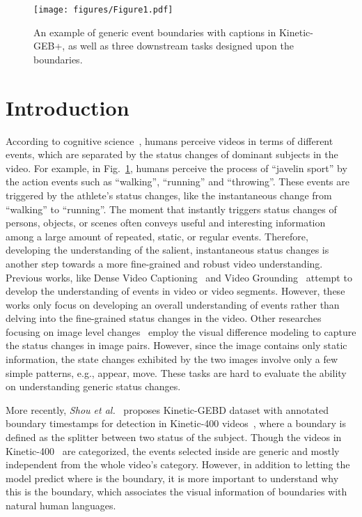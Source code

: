 \documentclass[runningheads]{llncs}
\begin{document}
\begin{figure}[t]
\centering
\texttt{[image: figures/Figure1.pdf]}
\setlength{\abovecaptionskip}{0.5cm}
\caption{An example of generic event boundaries with captions in Kinetic-GEB+, as well as three downstream tasks designed upon the boundaries.}
\label{fig:overview}
\end{figure}

\section{Introduction}


According to cognitive science~\cite{radvansky2011event}, humans perceive videos in terms of different events, which are separated by the status changes of dominant subjects in the video. For example, in Fig.~\ref{fig:overview}, humans perceive the process of “javelin sport” by the action events such as “walking”, “running” and “throwing”. These events are triggered by the athlete’s status changes, like the instantaneous change from “walking” to “running”. The moment that instantly triggers status changes of persons, objects, or scenes often conveys useful and interesting information among a large amount of repeated, static, or regular events. Therefore, developing the understanding of the salient, instantaneous status changes is another step towards a more fine-grained and robust video understanding.
Previous works, like Dense Video Captioning~\cite{krishna2017dense,zhou2018towards,wang2021end,li2018jointly,iashin2020multi} and Video Grounding~\cite{regneri2013grounding,gao2017tall,cao2021pursuit,ge2019mac,mun2020local,yuan2019find,zeng2020dense} attempt to develop the understanding of events in video or video segments. However, these works only focus on developing an overall understanding of events rather than delving into the fine-grained status changes in the video. Other researches focusing on image level changes~\cite{park2019robust,jhamtani2018learning} employ the visual difference modeling to capture the status changes in image pairs. However, 
since the image contains only static information, the state changes exhibited by the two images involve only a few simple patterns, e.g., appear, move. These tasks are hard to evaluate the ability on understanding generic status changes.

More recently, \textit{Shou et al.}~\cite{shou2021generic} proposes Kinetic-GEBD dataset with annotated boundary timestamps for detection in Kinetic-400 videos~\cite{carreira2017quo}, where a boundary is defined as the splitter between two status of the subject. 
Though the videos in Kinetic-400~\cite{carreira2017quo} are categorized, the events selected inside are generic and mostly independent from the whole video's category.
However, in addition to letting the model predict where is the boundary, it is more important to understand why this is the boundary, which associates the visual information of boundaries with natural human languages.
\end{document}
